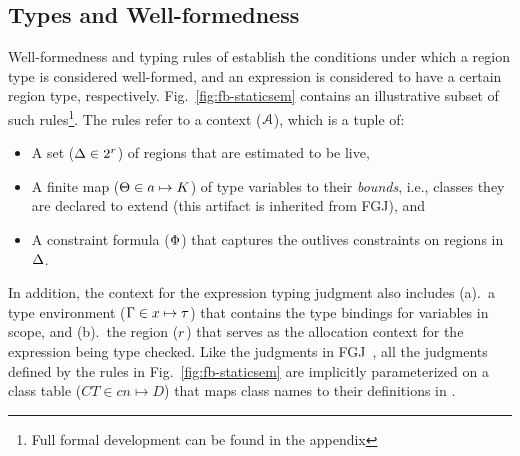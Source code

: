 \subsection{Types and Well-formedness}

Well-formedness and typing rules of \fbname establish the conditions
under which a region type is considered well-formed, and an expression
is considered to have a certain region type, respectively.
Fig.~\ref{fig:fb-staticsem} contains an illustrative subset of such
rules\footnote{Full formal development can be found in the
appendix}. The rules refer to a context (${\mathcal{A}}$), which is a tuple of:
\begin{itemize}
\item A set ($\Delta \in 2^r$) of regions that are estimated to be
live,
\item A finite map ($\Theta \in a \mapsto K$) of type
variables to their \emph{bounds}, i.e., classes they are declared to
extend (this artifact is inherited from FGJ), and
\item A constraint formula ($\Phi$) that captures the outlives
constraints on regions in $\Delta$.
\end{itemize}
In addition, the context for the expression typing judgment also
includes (a).~a type environment ($\Gamma \in x \mapsto \tau$) that
contains the type bindings for variables in scope, and (b).~the region
($r$) that serves as the allocation context for the expression
being type checked. Like the judgments in FGJ~\cite{fgj}, all the
judgments defined by the rules in Fig.~\ref{fig:fb-staticsem} are
implicitly parameterized on a class table ($CT \in cn \mapsto D$) that
maps class names to their definitions in \FB.



